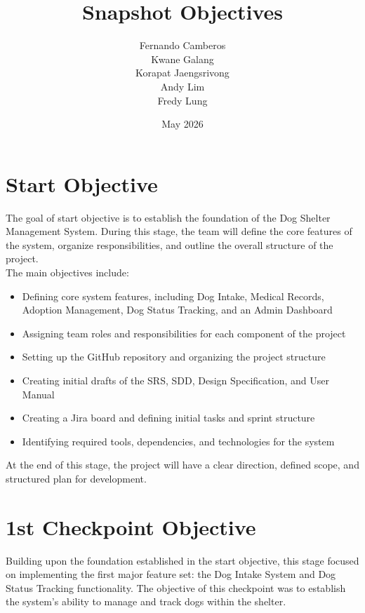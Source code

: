 \documentclass{article}
\title{Snapshot Objectives}
\author{
Fernando Camberos \\
Kwane Galang \\
Korapat Jaengsrivong \\
Andy Lim \\
Fredy Lung
}
\date{May 2026}
\begin{document}
\maketitle

\section*{Start Objective}

The goal of start objective is to establish the foundation of the Dog Shelter Management System. During this stage, the team will define the core features of the system, organize responsibilities, and outline the overall structure of the project.\\

The main objectives include:
\begin{itemize}
\item Defining core system features, including Dog Intake, Medical Records, Adoption Management, Dog Status Tracking, and an Admin Dashboard
\item Assigning team roles and responsibilities for each component of the project
\item Setting up the GitHub repository and organizing the project structure
\item Creating initial drafts of the SRS, SDD, Design Specification, and User Manual
\item Creating a Jira board and defining initial tasks and sprint structure
\item Identifying required tools, dependencies, and technologies for the system
\end{itemize}

\vspace{2mm}

\noindent At the end of this stage, the project will have a clear direction, defined scope, and structured plan for development.

\vspace{3mm}

\section*{1st Checkpoint Objective}

Building upon the foundation established in the start objective, this stage focused on implementing the first major feature set: the Dog Intake System and Dog Status Tracking functionality. The objective of this checkpoint was to establish the system’s ability to manage and track dogs within the shelter.\\
\end{document}
